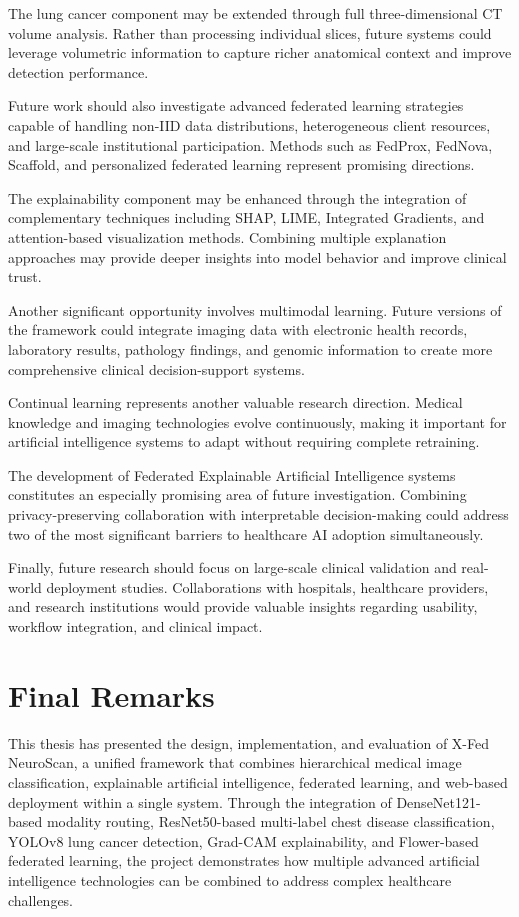 The lung cancer component may be extended through full three-dimensional CT volume analysis. Rather than processing individual slices, future systems could leverage volumetric information to capture richer anatomical context and improve detection performance.

Future work should also investigate advanced federated learning strategies capable of handling non-IID data distributions, heterogeneous client resources, and large-scale institutional participation. Methods such as FedProx, FedNova, Scaffold, and personalized federated learning represent promising directions.

The explainability component may be enhanced through the integration of complementary techniques including SHAP, LIME, Integrated Gradients, and attention-based visualization methods. Combining multiple explanation approaches may provide deeper insights into model behavior and improve clinical trust.

Another significant opportunity involves multimodal learning. Future versions of the framework could integrate imaging data with electronic health records, laboratory results, pathology findings, and genomic information to create more comprehensive clinical decision-support systems.

Continual learning represents another valuable research direction. Medical knowledge and imaging technologies evolve continuously, making it important for artificial intelligence systems to adapt without requiring complete retraining.

The development of Federated Explainable Artificial Intelligence systems constitutes an especially promising area of future investigation. Combining privacy-preserving collaboration with interpretable decision-making could address two of the most significant barriers to healthcare AI adoption simultaneously.

Finally, future research should focus on large-scale clinical validation and real-world deployment studies. Collaborations with hospitals, healthcare providers, and research institutions would provide valuable insights regarding usability, workflow integration, and clinical impact.

\section{Final Remarks}

This thesis has presented the design, implementation, and evaluation of X-Fed NeuroScan, a unified framework that combines hierarchical medical image classification, explainable artificial intelligence, federated learning, and web-based deployment within a single system. Through the integration of DenseNet121-based modality routing, ResNet50-based multi-label chest disease classification, YOLOv8 lung cancer detection, Grad-CAM explainability, and Flower-based federated learning, the project demonstrates how multiple advanced artificial intelligence technologies can be combined to address complex healthcare challenges.

